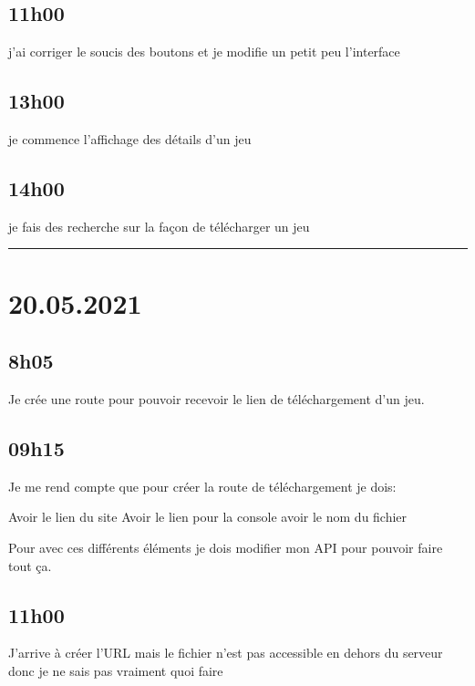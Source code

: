 \documentclass[a4paper,12pt,french]{sphinxmanual}
\begin{document}
\subsection{11h00}
\label{\detokenize{logbook:id133}}
\sphinxAtStartPar
j’ai corriger le soucis des boutons et je modifie un petit peu l’interface


\subsection{13h00}
\label{\detokenize{logbook:id134}}
\sphinxAtStartPar
je commence l’affichage des détails d’un jeu


\subsection{14h00}
\label{\detokenize{logbook:id135}}
\sphinxAtStartPar
je fais des recherche sur la façon de télécharger un jeu


\bigskip\hrule\bigskip



\section{20.05.2021}
\label{\detokenize{logbook:id136}}

\subsection{8h05}
\label{\detokenize{logbook:id137}}
\sphinxAtStartPar
Je crée une route pour pouvoir recevoir le lien de téléchargement d’un jeu.


\subsection{09h15}
\label{\detokenize{logbook:id138}}
\sphinxAtStartPar
Je me rend compte que pour créer la route de téléchargement je dois:

\sphinxAtStartPar
Avoir le lien du site
Avoir le lien pour la console
avoir le nom du fichier

\sphinxAtStartPar
Pour avec ces différents éléments je dois modifier mon API pour pouvoir faire tout ça.


\subsection{11h00}
\label{\detokenize{logbook:id139}}
\sphinxAtStartPar
J’arrive à créer l’URL mais le fichier n’est pas accessible en dehors du serveur donc je ne sais pas vraiment quoi faire
\end{document}
